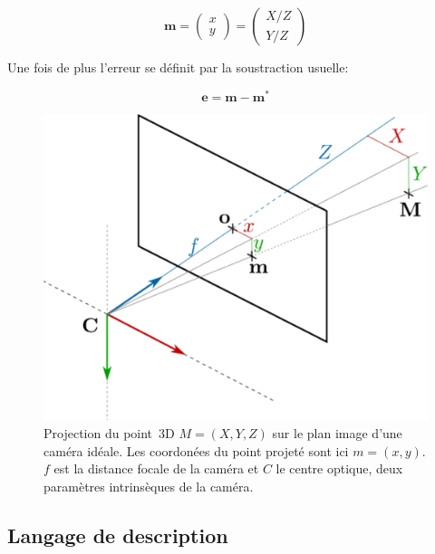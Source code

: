 \begin{equation}
  \mathbf{m} = \left(
  \begin{array}{c}
    x\\
    y
  \end{array}
  \right) = \left(
  \begin{array}{c}
    X / Z\\
    Y / Z
  \end{array}
  \right)
\end{equation}


Une fois de plus l'erreur se définit par la soustraction usuelle:

\begin{equation}
  \mathbf{e} = \mathbf{m} - \mathbf{m}^*
\end{equation}

\begin{figure}
  \begin{center}
    \includegraphics[width=.95\linewidth]{src/chap3-primitive-mouvement/cameraProj.pdf}
  \end{center}
  \caption{Projection du point 3D $M = (X, Y, Z)$ sur le plan image
    d'une caméra idéale. Les coordonées du point projeté sont ici $m =
    (x, y)$. $f$ est la distance focale de la caméra et $C$ le centre
    optique, deux paramètres intrinsèques de la caméra.}
\end{figure}




\subsection{Langage de description}

